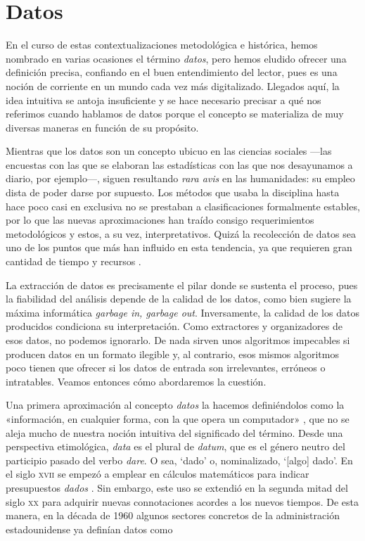 \section{Datos}
En el curso de estas contextualizaciones metodológica e histórica, hemos nombrado en varias ocasiones el término \textit{datos}, pero hemos eludido ofrecer una definición precisa, confiando en el buen entendimiento del lector, pues es una noción de corriente en un mundo cada vez más digitalizado. Llegados aquí, la idea intuitiva se antoja insuficiente y se hace necesario precisar a qué nos referimos cuando hablamos de datos porque el concepto se materializa de muy diversas maneras en función de su propósito.

Mientras que los datos son un concepto ubicuo en las ciencias sociales —las encuestas con las que se elaboran las estadísticas con las que nos desayunamos a diario, por ejemplo—, siguen resultando \textit{rara avis} en las humanidades: su empleo dista de poder darse por supuesto. Los métodos que usaba la disciplina hasta hace poco casi en exclusiva no se prestaban a clasificaciones formalmente estables, por lo que las nuevas aproximaciones han traído consigo requerimientos metodológicos y estos, a su vez, interpretativos. Quizá la recolección de datos sea uno de los puntos que más han influido en esta tendencia, ya que requieren gran cantidad de tiempo y recursos \parencite[41]{ehrlicher2019}.

La extracción de datos es precisamente el pilar donde se sustenta el proceso, pues la fiabilidad del análisis depende de la calidad de los datos, como bien sugiere la máxima informática \textit{garbage in, garbage out}. Inversamente, la calidad de los datos producidos condiciona su interpretación. Como extractores y organizadores de esos datos, no podemos ignorarlo. De nada sirven unos algoritmos impecables si producen datos en un formato ilegible y, al contrario, esos mismos algoritmos poco tienen que ofrecer si los datos de entrada son irrelevantes, erróneos o intratables. Veamos entonces cómo abordaremos la cuestión.

Una primera aproximación al concepto \textit{datos} la hacemos definiéndolos como la «información, en cualquier forma, con la que opera un computador» \parencite[\textit{s.v.} \textit{data}]{butterfield2016}, que no se aleja mucho de nuestra noción intuitiva del significado del término. Desde una perspectiva etimológica, \textit{data} es el plural de \textit{datum}, que es el género neutro del participio pasado del verbo \textit{dare}.  O sea, `dado' o, nominalizado, `[algo] dado'. En el siglo \textsc{xvii} se empezó a emplear en cálculos matemáticos para indicar presupuestos \textit{dados} \parencite[\textit{s.v.} \textit{data}]{onlineetymology}. Sin embargo, este uso se extendió  en la segunda mitad del siglo \textsc{xx} para adquirir nuevas connotaciones acordes a los nuevos tiempos. De esta manera, en la década de 1960 algunos sectores concretos de la administración estadounidense ya definían datos como

